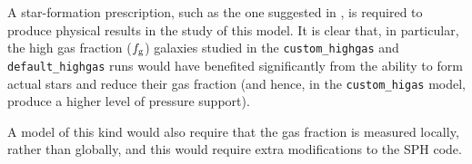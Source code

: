 A star-formation prescription, such as the one suggested in \citet{tasker_simulating_2006}, is required to produce physical results in the study of this model.
It is clear that, in particular, the high gas fraction ($f_\mathrm{g}$) galaxies studied in the {\tt custom\_highgas} and {\tt default\_highgas} runs would have benefited significantly from the ability to form actual stars and reduce their gas fraction (and hence, in the {\tt custom\_higas} model, produce a higher level of pressure support).

A model of this kind would also require that the gas fraction is measured locally, rather than globally, and this would require extra modifications to the SPH code.
